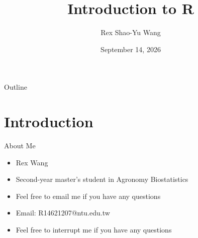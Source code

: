 \documentclass{beamer}					%
\title{Introduction to R}	%
\author{Rex Shao-Yu Wang}								%
\institute{}					%
\date{September 14, 2026}									%
\begin{document}
\begin{frame}
  \titlepage
\end{frame}

\begin{frame}{Outline}
  \tableofcontents
\end{frame}

%

\section{Introduction}
\begin{frame}{About Me}
  \begin{itemize}
    \item Rex Wang
    \item Second-year master's student in Agronomy Biostatistics
    \item Feel free to email me if you have any questions
    \item Email: R14621207@ntu.edu.tw
    \item Feel free to interrupt me if you have any questions
  \end{itemize}
\end{frame}
\end{document}
